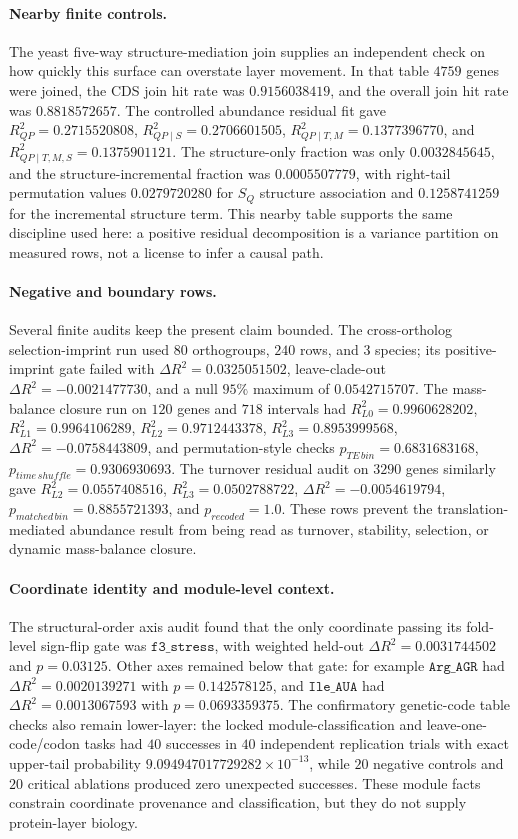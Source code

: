 \paragraph{Nearby finite controls.}
The yeast five-way structure-mediation join supplies an independent check on how quickly this surface can overstate layer movement.  In that table $4759$ genes were joined, the CDS join hit rate was $0.9156038419$, and the overall join hit rate was $0.8818572657$.  The controlled abundance residual fit gave $R^2_{QP}=0.2715520808$, $R^2_{QP\mid S}=0.2706601505$, $R^2_{QP\mid T,M}=0.1377396770$, and $R^2_{QP\mid T,M,S}=0.1375901121$.  The structure-only fraction was only $0.0032845645$, and the structure-incremental fraction was $0.0005507779$, with right-tail permutation values $0.0279720280$ for $S_Q$ structure association and $0.1258741259$ for the incremental structure term.  This nearby table supports the same discipline used here: a positive residual decomposition is a variance partition on measured rows, not a license to infer a causal path.

\paragraph{Negative and boundary rows.}
Several finite audits keep the present claim bounded.  The cross-ortholog selection-imprint run used $80$ orthogroups, $240$ rows, and $3$ species; its positive-imprint gate failed with $\Delta R^2=0.0325051502$, leave-clade-out $\Delta R^2=-0.0021477730$, and a null $95\%$ maximum of $0.0542715707$.  The mass-balance closure run on $120$ genes and $718$ intervals had $R^2_{L0}=0.9960628202$, $R^2_{L1}=0.9964106289$, $R^2_{L2}=0.9712443378$, $R^2_{L3}=0.8953999568$, $\Delta R^2=-0.0758443809$, and permutation-style checks $p_{TE\,bin}=0.6831683168$, $p_{time\,shuffle}=0.9306930693$.  The turnover residual audit on $3290$ genes similarly gave $R^2_{L2}=0.0557408516$, $R^2_{L3}=0.0502788722$, $\Delta R^2=-0.0054619794$, $p_{matched\,bin}=0.8855721393$, and $p_{recoded}=1.0$.  These rows prevent the translation-mediated abundance result from being read as turnover, stability, selection, or dynamic mass-balance closure.

\paragraph{Coordinate identity and module-level context.}
The structural-order axis audit found that the only coordinate passing its fold-level sign-flip gate was $\texttt{f3\_stress}$, with weighted held-out $\Delta R^2=0.0031744502$ and $p=0.03125$.  Other axes remained below that gate: for example $\texttt{Arg\_AGR}$ had $\Delta R^2=0.0020139271$ with $p=0.142578125$, and $\texttt{Ile\_AUA}$ had $\Delta R^2=0.0013067593$ with $p=0.0693359375$.  The confirmatory genetic-code table checks also remain lower-layer: the locked module-classification and leave-one-code/codon tasks had $40$ successes in $40$ independent replication trials with exact upper-tail probability $9.094947017729282\times 10^{-13}$, while $20$ negative controls and $20$ critical ablations produced zero unexpected successes.  These module facts constrain coordinate provenance and classification, but they do not supply protein-layer biology.

